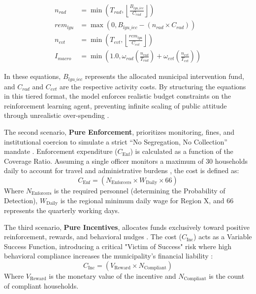 \begin{itemize}
\begin{align}
    n_{rad} &= \min \left( T_{rad}, \left\lfloor \frac{B_{lgu\_iec}}{C_{rad}} \right\rfloor \right) \label{eq:macro_radio} \\
    rem_{lgu} &= \max \left( 0, B_{lgu\_iec} - (n_{rad} \times C_{rad}) \right) \label{eq:macro_rem} \\
    n_{evt} &= \min \left( T_{evt}, \left\lfloor \frac{rem_{lgu}}{C_{evt}} \right\rfloor \right) \label{eq:macro_event} \\
    I_{macro} &= \min \left( 1.0, \omega_{rad} \left( \frac{n_{rad}}{T_{rad}} \right) + \omega_{evt} \left( \frac{n_{evt}}{T_{evt}} \right) \right) \label{eq:macro_intensity}
\end{align}

    In these equations, $B_{lgu\_iec}$ represents the allocated municipal intervention fund, and $C_{rad}$ and $C_{evt}$ are the respective activity costs. By structuring the equations in this tiered format, the model enforces realistic budget constraints on the reinforcement learning agent, preventing infinite scaling of public attitude through unrealistic over-spending \citep{TianReview2024}.
\end{itemize}

The second scenario, \textbf{Pure Enforcement}, prioritizes monitoring, fines, and institutional coercion to simulate a strict ``No Segregation, No Collection'' mandate \citep{Wang2023, Dalugdog2021}. Enforcement expenditure ($C_{\mathrm{Enf}}$) is calculated as a function of the Coverage Ratio. Assuming a single officer monitors a maximum of 30 households daily to account for travel and administrative burdens \citep{Nishimura2022}, the cost is defined as:
\begin{equation}
    C_{\mathrm{Enf}} = (N_{\mathrm{Enforcers}} \times W_{\mathrm{Daily}} \times 66)
    \label{eq:cost_enforcement}
\end{equation}
\noindent Where $N_{\mathrm{Enforcers}}$ is the required personnel (determining the Probability of Detection), $W_{\mathrm{Daily}}$ is the regional minimum daily wage for Region X, and 66 represents the quarterly working days.

The third scenario, \textbf{Pure Incentives}, allocates funds exclusively toward positive reinforcement, rewards, and behavioral nudges \citep{LoanBalanay2023, Chen2023, MuZhang2021, Vorobeva2022}. The cost ($C_{\mathrm{Inc}}$) acts as a Variable Success Function, introducing a critical "Victim of Success" risk where high behavioral compliance increases the municipality's financial liability \citep{WorldBank2022}:
\begin{equation}
    C_{\mathrm{Inc}} = (V_{\mathrm{Reward}} \times N_{\mathrm{Compliant}})
    \label{eq:cost_incentives}
\end{equation}
\noindent Where $V_{\mathrm{Reward}}$ is the monetary value of the incentive and $N_{\mathrm{Compliant}}$ is the count of compliant households.

